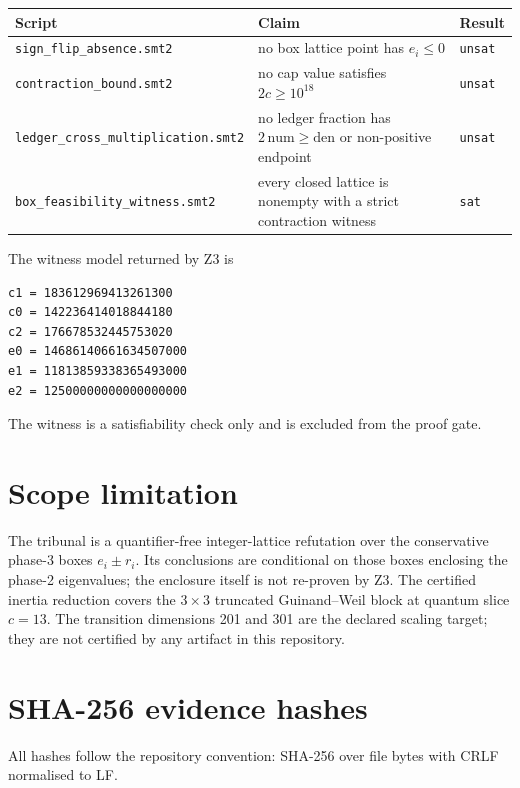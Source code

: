 \documentclass[11pt]{article}
\newcommand{\code}[1]{\texttt{#1}}
\begin{document}
\begin{center}
\begin{tabular}{@{}lll@{}}
\toprule
Script & Claim & Result \\
\midrule
\code{sign\_flip\_absence.smt2} & no box lattice point has $e_i \le 0$ & \code{unsat} \\
\code{contraction\_bound.smt2} & no cap value satisfies $2c \ge 10^{18}$ & \code{unsat} \\
\code{ledger\_cross\_multiplication.smt2} & no ledger fraction has $2\,\text{num} \ge \text{den}$ or non-positive endpoint & \code{unsat} \\
\code{box\_feasibility\_witness.smt2} & every closed lattice is nonempty with a strict contraction witness & \code{sat} \\
\bottomrule
\end{tabular}
\end{center}

The witness model returned by Z3 is
\begin{verbatim}
c1 = 183612969413261300
c0 = 142236414018844180
c2 = 176678532445753020
e0 = 14686140661634507000
e1 = 11813859338365493000
e2 = 12500000000000000000
\end{verbatim}
The witness is a satisfiability check only and is excluded from the proof gate.

\section{Scope limitation}

The tribunal is a quantifier-free integer-lattice refutation over the conservative phase-3 boxes $e_i \pm r_i$. Its conclusions are conditional on those boxes enclosing the phase-2 eigenvalues; the enclosure itself is not re-proven by Z3. The certified inertia reduction covers the $3 \times 3$ truncated Guinand--Weil block at quantum slice $c = 13$. The transition dimensions 201 and 301 are the declared scaling target; they are not certified by any artifact in this repository.

\section{SHA-256 evidence hashes}

All hashes follow the repository convention: SHA-256 over file bytes with CRLF normalised to LF.
\end{document}
